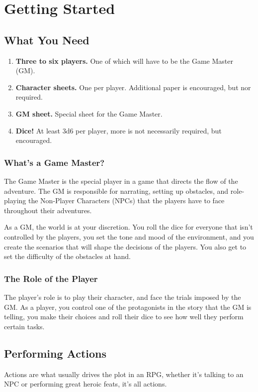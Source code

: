 \chapter{Getting Started}
\section{What You Need}
\begin{enumerate}
    \item \textbf{Three to six players.} One of which will have to be the Game Master (GM).
    \item \textbf{Character sheets.} One per player. Additional paper is encouraged, but nor required.
    \item \textbf{GM sheet.} Special sheet for the Game Master.
    \item \textbf{Dice!} At least 3d6 per player, more is not necessarily required, but encouraged.
\end{enumerate}

\subsection{What's a Game Master?}
The Game Master is the special player in a game that directs the flow of the adventure.
The GM is responsible for narrating, setting up obstacles, and role-playing the Non-Player Characters (NPCs) that the players have to face throughout their adventures.

As a GM, the world is at your discretion. 
You roll the dice for everyone that isn't controlled by the players, you set the tone and mood of the environment, and you create the scenarios that will shape the decisions of the players.
You also get to set the difficulty of the obstacles at hand.

\subsection{The Role of the Player}
The player's role is to play their character, and face the trials imposed by the GM.
As a player, you control one of the protagonists in the story that the GM is telling, you make their choices and roll their dice to see how well they perform certain tasks.

\section{Performing Actions}
Actions are what usually drives the plot in an RPG, whether it's talking to an NPC or performing great heroic feats, it's all actions.

